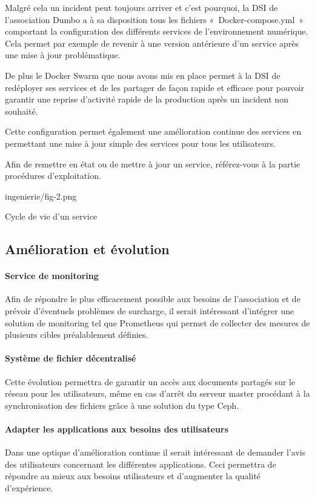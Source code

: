 Malgré cela un incident peut toujours arriver et c'est pourquoi, la DSI
de l'association Dumbo a à sa disposition tous les fichiers
«~Docker-compose.yml~» comportant la configuration des différents
services de l'environnement numérique. Cela permet par exemple de
revenir à une version antérieure d'un service après une mise à jour
problématique.

De plus le Docker Swarm que nous avons mis en place permet à la DSI de
redéployer ses services et de les partager de façon rapide et efficace
pour pouvoir garantir une reprise d'activité rapide de la production
après un incident non souhaité.

Cette configuration permet également une amélioration continue des
services en permettant une mise à jour simple des services pour tous les
utilisateurs.

Afin de remettre en état ou de mettre à jour un service, référez-vous à
la partie procédures d'exploitation.

\begin{figue}{0.35}{ingenierie/fig-2.png}
\caption{Cycle de vie d'un service}
\end{figue}

\subsection{Amélioration et évolution}

\paragraph{Service de monitoring}

Afin de répondre le plus efficacement possible aux besoins de
l'association et de prévoir d'éventuels problèmes de surcharge, il
serait intéressant d'intégrer une solution de monitoring tel que
Prometheus qui permet de collecter des mesures de plusieurs cibles
préalablement définies.

\paragraph{Système de fichier décentralisé}

Cette évolution permettra de garantir un accès aux documents partagés
sur le réseau pour les utilisateurs, même en cas d'arrêt du serveur
master procédant à la synchronisation des fichiers grâce à une solution
du type Ceph.

\paragraph{Adapter les applications aux besoins des utilisateurs}

Dans une optique d'amélioration continue il serait intéressant de
demander l'avis des utilisateurs concernant les différentes
applications. Ceci permettra de répondre au mieux aux besoins
utilisateurs et d'augmenter la qualité d'expérience.
